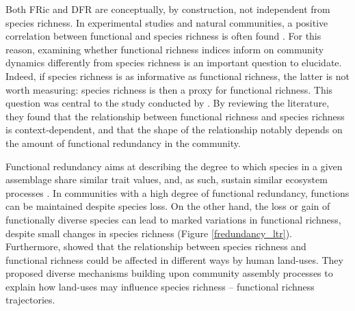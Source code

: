 \vspace{0.5cm}
Both FRic and DFR are conceptually, by construction, not independent from species richness. In experimental studies and natural communities, a positive correlation between functional and species richness is often found \citep{Cadotte2011}. For this reason, examining whether functional richness indices inform on community dynamics differently from species richness is an important question to elucidate. Indeed, if species richness is as informative as functional richness, the latter is not worth measuring: species richness is then a proxy for functional richness. This question was central to the study conducted by \citet{Cadotte2011}. By reviewing the literature, they found that the relationship between functional richness and species richness is context-dependent, and that the shape of the relationship notably depends on the amount of functional redundancy in the community. 

Functional redundancy aims at describing the degree to which species in a given assemblage share similar trait values, and, as such, sustain similar ecosystem processes \citep{Mayfield2010, Rosenfeld2002, Ricotta2016}. In communities with a high degree of functional redundancy, functions can be maintained despite species loss. On the other hand, the loss or gain of functionally diverse species can lead to marked variations in functional richness, despite small changes in species richness (Figure \ref{fredundancy_ltr}). Furthermore, \citet{Mayfield2010} showed that the relationship between species richness and functional richness could be affected in different ways by human land-uses. They proposed diverse mechanisms building upon community assembly processes to explain how land-uses may influence species richness – functional richness trajectories.  

